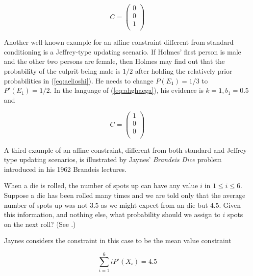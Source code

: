 \documentclass[phd,12pt,oneside]{ubcthesis}
\begin{document}
\begin{equation}
  \label{eq:uphaicho}
  C=\left(
  \begin{array}{c}
    0 \\
    0 \\
    1 \\
  \end{array}\right)
\end{equation}

Another well-known example for an affine constraint different from
standard conditioning is a Jeffrey-type updating scenario. If Holmes'
first person is male and the other two persons are female, then Holmes
may find out that the probability of the culprit being male is $1/2$
after holding the relatively prior probabilities in
(\ref{eq:aelioshi}). He needs to change $P(E_{1})=1/3$ to
$P'(E_{1})=1/2$. In the language of (\ref{eq:ahghaega}), his evidence
is $k=1,b_{1}=0.5$ and

\begin{equation}
  \label{eq:eifohgee}
  C=\left(
  \begin{array}{c}
    1 \\
    0 \\
    0 \\
  \end{array}\right)
\end{equation}

A third example of an affine constraint, different from both standard
and Jeffrey-type updating scenarios, is illustrated by Jaynes'
\emph{Brandeis Dice} problem introduced in his 1962 Brandeis lectures.

\begin{quotex}
  \label{ex:brandeis} When a die is rolled,
  the number of spots up can have any value $i$ in $1\leq{}i\leq{}6$.
  Suppose a die has been rolled many times and we are told only that
  the average number of spots up was not $3.5$ as we might expect from
  an  die but $4.5$. Given this information, and nothing
  else, what probability should we assign to $i$ spots on the next
  roll? (See .)
\end{quotex}

{\noindent}Jaynes considers the constraint in this case to be the mean value
constraint

\begin{equation}
  \label{eq:thiebaiw}
  \sum_{i=1}^{6}iP'(X_{i})=4.5
\end{equation}
\end{document}
